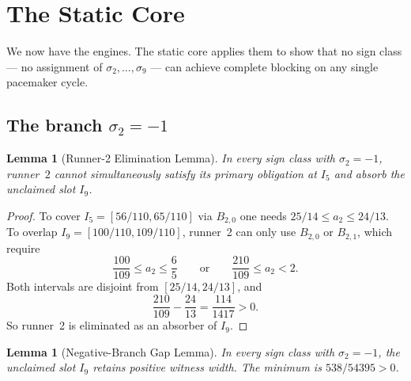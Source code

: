 \documentclass[12pt,a4paper]{amsart}
\newtheorem{lemma}[theorem]{Lemma}
\theoremstyle{definition}
\theoremstyle{remark}
\begin{document}
\section{The Static Core}

We now have the engines. The static core applies them to show that no sign class --- no
assignment of $\sigma_2,\ldots,\sigma_9$ --- can achieve complete blocking on any single
pacemaker cycle.

\subsection{The branch \texorpdfstring{$\sigma_2=-1$}{sigma2 = -1}}

\begin{lemma}[Runner-2 Elimination Lemma]
In every sign class with $\sigma_2=-1$, runner~$2$ cannot simultaneously satisfy its
primary obligation at $I_5$ and absorb the unclaimed slot $I_9$.
\end{lemma}

\begin{proof}
To cover $I_5=[56/110,65/110]$ via $B_{2,0}$ one needs $25/14\le a_2\le 24/13$.
To overlap $I_9=[100/110,109/110]$, runner~2 can only use $B_{2,0}$ or $B_{2,1}$,
which require
\[
  \frac{100}{109}\le a_2\le \frac{6}{5}\qquad\text{or}\qquad
  \frac{210}{109}\le a_2<2.
\]
Both intervals are disjoint from $[25/14,24/13]$, and
\[
  \frac{210}{109}-\frac{24}{13}=\frac{114}{1417}>0.
\]
So runner~2 is eliminated as an absorber of $I_9$.
\end{proof}

\begin{lemma}[Negative-Branch Gap Lemma]
In every sign class with $\sigma_2=-1$, the unclaimed slot $I_9$ retains positive witness
width. The minimum is $538/54395>0$.
\end{lemma}
\end{document}
